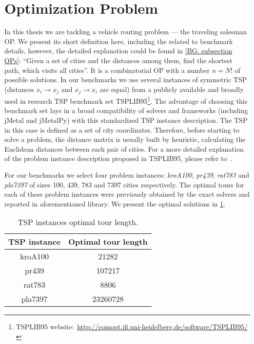 \section{Optimization Problem}\label{eval: op}
In this thesis we are tackling a vehicle routing problem --- the traveling salesman OP. We present its short definition here, including the related to benchmark details, however, the detailed explanation could be found in \cref{BG: subsection OPs}: ``Given a set of cities and the distances among them, find the shortest path, which visits all cities''. It is a combinatorial OP with a number $n = N!$ of possible solutions. In our benchmarks we use several instances of symmetric TSP (distances $x_i \rightarrow x_j$ and $x_j \rightarrow x_i$ are equal) from a publicly available and broadly used in research TSP benchmark set TSPLIB95\footnote{TSPLIB95 website:~\url{http://comopt.ifi.uni-heidelberg.de/software/TSPLIB95/}}. The advantage of choosing this benchmark set lays in a broad compatibility of solvers and frameworks (including jMetal and jMetalPy) with this standardized TSP instance description. The TSP in this case is defined as a set of city coordinates. Therefore, before starting to solve a problem, the distance matrix is usually built by heuristic, calculating the Euclidean distances between each pair of cities. For a more detailed explanation of the problem instance description proposed in TSPLIB95, please refer to~\cite{reinelt1995tsplib95}.

For our benchmarks we select four problem instances: \emph{kroA100}, \emph{pr439}, \emph{rat783} and \emph{pla7397} of sizes 100, 439, 783 and 7397 cities respectively. The optimal tours for each of these problem instances were previously obtained by the exact solvers and reported in aforementioned library. We present the optimal solutions in \cref{eval:table:tsp optimal tour length}.

\begin{table}[h!]
	\centering
	\begin{tabular}{cc}
		\rowcolor{gray!10}
		\hline
		\textbf{TSP instance} & \textbf{Optimal tour length} \\
		\hline
		kroA100 & 21282 \\
		pr439 & 107217 \\
		rat783 & 8806 \\
		pla7397 & 23260728 \\
		\hline
	\end{tabular}
	\caption{TSP instances optimal tour length.}
	\label{eval:table:tsp optimal tour length}
\end{table}


